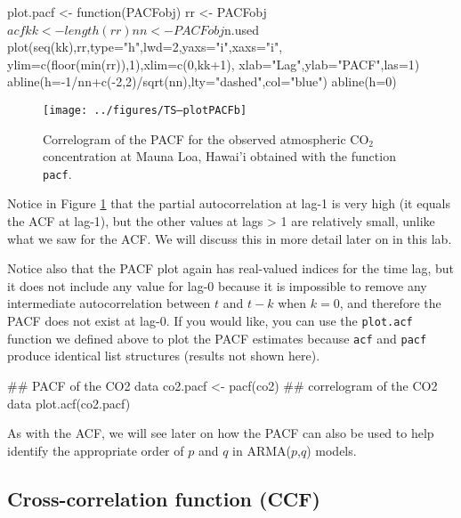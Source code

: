\begin{Schunk}
\begin{Sinput}
 plot.pacf <- function(PACFobj) {
   rr <- PACFobj$acf
   kk <- length(rr)
   nn <- PACFobj$n.used
   plot(seq(kk),rr,type="h",lwd=2,yaxs="i",xaxs="i",
        ylim=c(floor(min(rr)),1),xlim=c(0,kk+1),
        xlab="Lag",ylab="PACF",las=1)
   abline(h=-1/nn+c(-2,2)/sqrt(nn),lty="dashed",col="blue")
   abline(h=0)
 }                                                                                                            
\end{Sinput}
\end{Schunk}

\begin{figure}[htp]
\begin{center}
\texttt{[image: ../figures/TS--plotPACFb]}
\end{center}
\caption{Correlogram of the PACF for the observed atmospheric CO$_2$ concentration at Mauna Loa, Hawai'i obtained with the function \texttt{pacf}.}
\label{fig:LW1.figPACF}
\end{figure}

\noindent Notice in Figure \ref{fig:LW1.figPACF} that the partial autocorrelation at lag-1 is very high (it equals the ACF at lag-1), but the other values at lags > 1 are relatively small, unlike what we saw for the ACF.  We will discuss this in more detail later on in this lab.

Notice also that the PACF plot again has real-valued indices for the time lag, but it does not include any value for lag-0 because it is impossible to remove any intermediate autocorrelation between $t$ and $t-k$ when $k=0$, and therefore the PACF does not exist at lag-0.  If you would like, you can use the \texttt{plot.acf} function we defined above to plot the PACF estimates because \texttt{acf} and \texttt{pacf} produce identical list structures (results not shown here).

\begin{Schunk}
\begin{Sinput}
 ## PACF of the CO2 data
 co2.pacf <- pacf(co2)
 ## correlogram of the CO2 data
 plot.acf(co2.pacf)
\end{Sinput}
\end{Schunk}

As with the ACF, we will see later on how the PACF can also be used to help identify the appropriate order of $p$ and $q$ in ARMA($p$,$q$) models.

\subsection{Cross-correlation function (CCF)}

